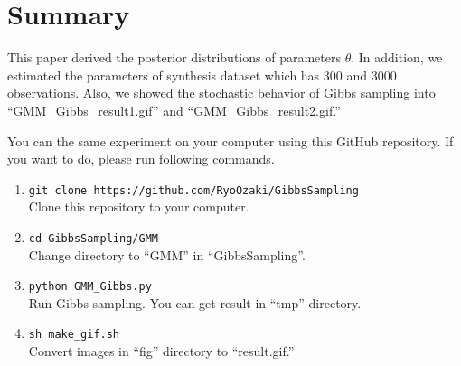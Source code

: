 \documentclass[a4paper]{article}
\begin{document}
	\newpage
	\section{Summary}
	This paper derived the posterior distributions of parameters $\theta$.
	In addition, we estimated the parameters of synthesis dataset which has 300 and 3000 observations.
	Also, we showed the stochastic behavior of Gibbs sampling into ``GMM\_Gibbs\_result1.gif'' and ``GMM\_Gibbs\_result2.gif.''

	You can the same experiment on your computer using this GitHub repository.
	If you want to do, please run following commands.
	\begin{enumerate}
		\item \verb|git clone https://github.com/RyoOzaki/GibbsSampling|\\
			Clone this repository to your computer.
		\item \verb|cd GibbsSampling/GMM|\\
			Change directory to ``GMM'' in ``GibbsSampling''.
		\item \verb|python GMM_Gibbs.py|\\
			Run Gibbs sampling. You can get result in ``tmp'' directory.
		\item \verb|sh make_gif.sh|\\
			Convert images in ``fig'' directory to ``result.gif.''
	\end{enumerate}
\end{document}
